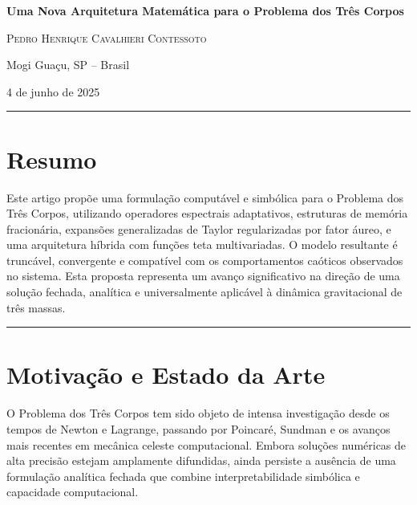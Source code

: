 \documentclass[12pt]{article}
\begin{document}
\begin{titlepage}
    \centering
    \vspace*{3cm}

    {\LARGE\bfseries Uma Nova Arquitetura Matemática para o Problema dos Três Corpos \par}
    \vspace{1.5cm}

    {\large\scshape Pedro Henrique Cavalhieri Contessoto \par}
    \vspace{0.3cm}

    {\normalsize Mogi Guaçu, SP – Brasil \par}
    \vspace{0.3cm}

    {\normalsize 4 de junho de 2025 \par}

    \vfill

    \rule{\textwidth}{0.4pt}
    \section*{Resumo}
    \normalsize
    Este artigo propõe uma formulação computável e simbólica para o Problema dos Três Corpos, utilizando operadores espectrais adaptativos, estruturas de memória fracionária, expansões generalizadas de Taylor regularizadas por fator áureo, e uma arquitetura híbrida com funções teta multivariadas. O modelo resultante é truncável, convergente e compatível com os comportamentos caóticos observados no sistema. Esta proposta representa um avanço significativo na direção de uma solução fechada, analítica e universalmente aplicável à dinâmica gravitacional de três massas.
    \rule{\textwidth}{0.4pt}

    \vfill
\end{titlepage}

\section{Motivação e Estado da Arte}

O Problema dos Três Corpos tem sido objeto de intensa investigação desde os tempos de Newton e Lagrange, passando por Poincaré, Sundman e os avanços mais recentes em mecânica celeste computacional. Embora soluções numéricas de alta precisão estejam amplamente difundidas, ainda persiste a ausência de uma formulação analítica fechada que combine interpretabilidade simbólica e capacidade computacional.
\end{document}
